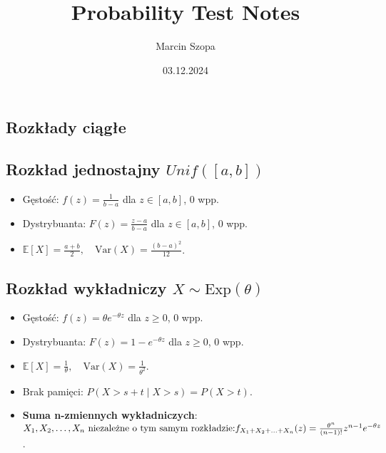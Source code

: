\documentclass{article}
\title{Probability Test Notes}
\author{Marcin Szopa}
\date{03.12.2024}
\theoremstyle{definition}
\theoremstyle{remark}
\begin{document}
\begin{multicols}{2}
    \section*{Rozkłady ciągłe}

    \subsection*{Rozkład jednostajny \(Unif([a, b]) \)}
    \begin{itemize}[itemsep=0pt, left=0pt]
        \item Gęstość: \( f(z) = \frac{1}{b-a} \) dla \( z \in [a, b] \), 0 wpp.
        \item Dystrybuanta: \( F(z) = \frac{z-a}{b-a} \) dla \( z \in [a, b] \), 0 wpp.
        \item \(\mathbb{E}[X] = \frac{a+b}{2}, \quad \text{Var}(X) = \frac{(b-a)^2}{12}\).
    \end{itemize}

    \subsection*{Rozkład wykładniczy \( X \sim \text{Exp}(\theta) \)}
    \begin{itemize}[itemsep=0pt, left=0pt]
        \item Gęstość: \( f(z) = \theta e^{-\theta z} \) dla \( z \geq 0 \), 0 wpp.
        \item Dystrybuanta: \( F(z) = 1 - e^{-\theta z} \) dla \( z \geq 0 \), 0 wpp.
        \item \(\mathbb{E}[X] = \frac{1}{\theta}, \quad \text{Var}(X) = \frac{1}{\theta^2}\).
        \item Brak pamięci: \( P(X > s+t \mid X > s) = P(X > t) \). 
          
        \item \textbf{Suma n-zmiennych wykładniczych}: \(X_1, X_2, \ldots, X_n \\
        \text{ niezależne o tym samym rozkładzie:} \\
         f_{X_1 + X_2 + \ldots + X_n}(z) =  \frac{\theta^n}{(n-1)!}z^{n-1}e^{-\theta z}\).
    \end{itemize}


\end{multicols}
\end{document}
